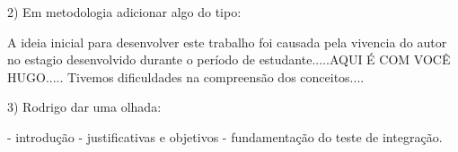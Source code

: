 2) Em metodologia adicionar algo do tipo:

    A ideia inicial para desenvolver este trabalho foi causada pela vivencia do autor no estagio desenvolvido durante o período de estudante.....AQUI É COM VOCÊ HUGO..... Tivemos dificuldades na compreensão dos conceitos....


3) Rodrigo dar uma olhada:

  - introdução
  - justificativas e objetivos
  - fundamentação do teste de integração.